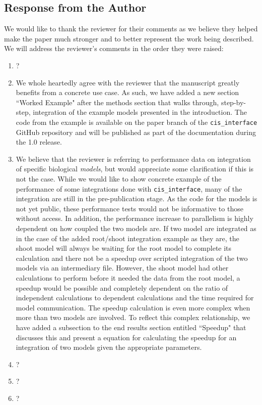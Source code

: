 \documentclass[11pt]{article}
\newcommand{\pkg}{{\tt cis\_interface}{}}
\begin{document}
\subsection{Response from the Author}

We would like to thank the reviewer for their comments as we believe they helped make the paper much stronger and to better represent the work being described. We will address the reviewer's comments in the order they were raised:
\begin{enumerate}
\item ?
\item We whole heartedly agree with the reviewer that the manuscript greatly benefits from a concrete use case. As such, we have added a new section ``Worked Example" after the methods section that walks through, step-by-step, integration of the example models presented in the introduction. The code from the example is available on the paper branch of the {\pkg} GitHub repository and will be published as part of the documentation during the 1.0 release.
\item We believe that the reviewer is referring to performance data on integration of specific biological \emph{models}, but would appreciate some clarification if this is not the case. While we would like to show concrete example of the performance of some integrations done with {\pkg}, many of the integration are still in the pre-publication stage. As the code for the models is not yet public, these performance tests would not be informative to those without access. In addition, the performance increase to parallelism is highly dependent on how coupled the two models are. If two model are integrated as in the case of the added root/shoot integration example as they are, the shoot model will always be waiting for the root model to complete its calculation and there not be a speedup over scripted integration of the two models via an intermediary file. However, the shoot model had other calculations to perform before it needed the data from the root model, a speedup would be possible and completely dependent on the ratio of independent calculations to dependent calculations and the time required for model communication. The speedup calculation is even more complex when more than two models are involved. To reflect this complex relationship, we have added a subsection to the end results section entitled ``Speedup" that discusses this and present a equation for calculating the speedup for an integration of two models given the appropriate parameters.
\item ?
\item ?
\item ?
\end{enumerate}
\end{document}
